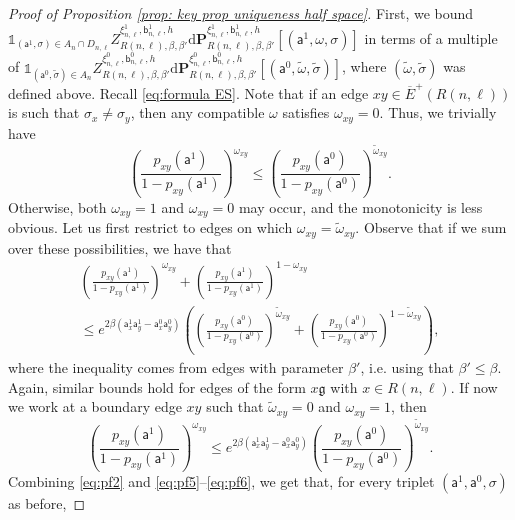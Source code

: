 \documentclass[11pt,a4paper]{article}
\numberwithin{equation}{section}
\theoremstyle{plain}
\theoremstyle{definition}
\newcommand\fg{\mathfrak{g}}
\begin{document}
\begin{proof}[Proof of Proposition \textup{\ref{prop: key prop uniqueness half space}}]
First, we bound $\mathds{1}_{(\mathsf{a}^1,\sigma)\in A_n\cap D_{n,\ell}} Z^{\xi^1_{n,\ell},\mathsf{b}_{n,\ell}^1,h}_{R(n,\ell),\beta,\beta'}\mathrm{d}\mathbf P^{\xi^1_{n,\ell},\mathsf b^1_{n,\ell}, h}_{R(n,\ell), \beta,\beta'}[(\mathsf{a}^1,\omega,\sigma)]$ in terms of a multiple of $\mathds{1}_{(\mathsf{a}^0,\tilde \sigma)\in A_n} Z^{\xi^0_{n,\ell},\mathsf{b}_{n,\ell}^0,h}_{R(n,\ell),\beta,\beta'}\mathrm{d}\mathbf P^{\xi^0_{n,\ell},\mathsf b^0_{n,\ell}, h}_{R(n,\ell), \beta,\beta'}[(\mathsf{a}^0,\tilde \omega,\tilde \sigma)]$, where $(\tilde \omega,\tilde \sigma)$ was defined above. Recall \eqref{eq:formula ES}. Note that if an edge $xy\in \overline{E}^+(R(n,\ell))$ is such that $\sigma_x\neq \sigma_y$, then any compatible $\omega$ satisfies $\omega_{xy}=0$. Thus, we trivially have 
\begin{equation} \label{eq:pf5}
\left(\frac{p_{xy}(\mathsf{a}^1)}{1-p_{xy}(\mathsf{a}^1)
}\right)^{\omega_{xy}}\leq \left(\frac{p_{xy}(\mathsf{a}^0)}{1-p_{xy}(\mathsf{a}^0)}\right)^{\tilde\omega_{xy}}. 
\end{equation}
Otherwise, both $\omega_{xy}=1$ and $\omega_{xy}=0$ may occur, and the monotonicity is less obvious. Let us first restrict to edges on which $\omega_{xy}=\tilde \omega_{xy}$. Observe that if we sum over these possibilities, we have that
\begin{multline} \label{eq:pf6}
\left(\frac{p_{xy}(\mathsf{a}^1)}{1-p_{xy}(\mathsf{a}^1)}\right)^{\omega_{xy}}+\left(\frac{p_{xy}(\mathsf{a}^1)}{1-p_{xy}(\mathsf{a}^1)}\right)^{1-\omega_{xy}}\\\leq e^{2\beta(\mathsf{a}^1_x \mathsf{a}^1_y-\mathsf{a}^0_x \mathsf{a}^0_y)}\left(\left(\frac{p_{xy}(\mathsf{a}^0)}{1-p_{xy}(\mathsf{a}^0)}\right)^{\tilde\omega_{xy}}+\left(\frac{p_{xy}(\mathsf{a}^0)}{1-p_{xy}(\mathsf{a}^0)}\right)^{1-\tilde\omega_{xy}}\right),
\end{multline}
where the inequality comes from edges with parameter $\beta'$, i.e. using that $\beta'\leq \beta$. Again, similar bounds hold for edges of the form $x\fg$ with $x\in R(n,\ell)$. If now we work at a boundary edge $xy$ such that $\tilde \omega_{xy}=0$ and $\omega_{xy}=1$, then
\begin{equation}
    \left(\frac{p_{xy}(\mathsf{a}^1)}{1-p_{xy}(\mathsf{a}^1)}\right)^{\omega_{xy}}\leq e^{2\beta(\mathsf{a}^1_x \mathsf{a}^1_y-\mathsf{a}^0_x \mathsf{a}^0_y)}\left(\frac{p_{xy}(\mathsf{a}^0)}{1-p_{xy}(\mathsf{a}^0)}\right)^{\tilde\omega_{xy}}.
\end{equation}
Combining \eqref{eq:pf2} and \eqref{eq:pf5}--\eqref{eq:pf6}, we get that, for every triplet $(\mathsf{a}^1,\mathsf{a}^0,\sigma)$ as before,

\end{proof}
\end{document}
